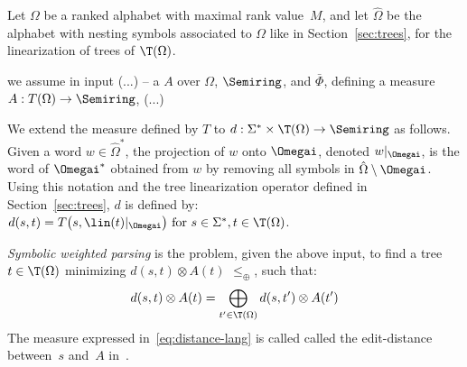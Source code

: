 
Let $\Omega$ be a ranked alphabet
with maximal rank value~$M$, 
and let $\hat\Omega$
be the alphabet with nesting symbols associated to $\Omega$ like in Section~\ref{sec:trees},
for the linearization of trees of $\T(\Omega)$.

we assume in input
(...)
-- a \SWTA $A$ over $\Omega$, $\Semiring$, and $\bar\Phi$,
defining a measure $A: T(\Omega) \to \Semiring$,
(...)

\noindent 
We extend the measure defined by $T$ to 
$d : \Sigma^* \times \T(\Omega) \to \Semiring$ as follows.
Given a word $w \in {\hat\Omega}^*$, the projection of $w$ onto $\Omegai$,
denoted $w|_\Omegai$,
is the word of $\Omegai^*$ obtained from $w$ by removing all symbols 
in $\hat\Omega \setminus \Omegai$.
Using this notation
and the tree linearization operator defined in Section~\ref{sec:trees}, 
$d$ is defined by:
\(
d(s, t) = T\bigl(s, \lin(t)|_\Omegai \bigr)  \mathrm{~for~} s \in \Sigma^*, t\in \T(\Omega)
\).

\noindent 
\emph{Symbolic weighted parsing} is the problem, 
given the above input, 
to find a tree $t \in \T(\Omega)$ %
minimizing \( d(s, t) \otimes A(t)\)
\wrt $\leq_\oplus$, 
\ie such that: %
%
\begin{equation}\label{eq:distance-lang}
d(s, t) \otimes A(t) = \displaystyle\bigoplus_{t' \in \T(\Omega)} d(s, t') \otimes A(t') 
\end{equation}
%
The measure expressed in~\eqref{eq:distance-lang} is called
called the edit-distance between~$s$ and~$A$ in~\cite{Mohri03ijfcs}.
